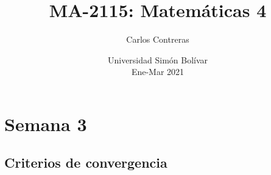 \documentclass[12pt,oneside]{book}
\title{\bf MA-2115: Matemáticas 4}
\author{Carlos Contreras}
\date{Universidad Simón Bolívar \\ Ene-Mar 2021}
\newcounter{weekpage}
\begin{document}









\chapter{Semana 3}
\setcounter{weekpage}{1}
\thispagestyle{plainweek}

\setcounter{chapter}{3}

\section{Criterios de convergencia}
\end{document}
